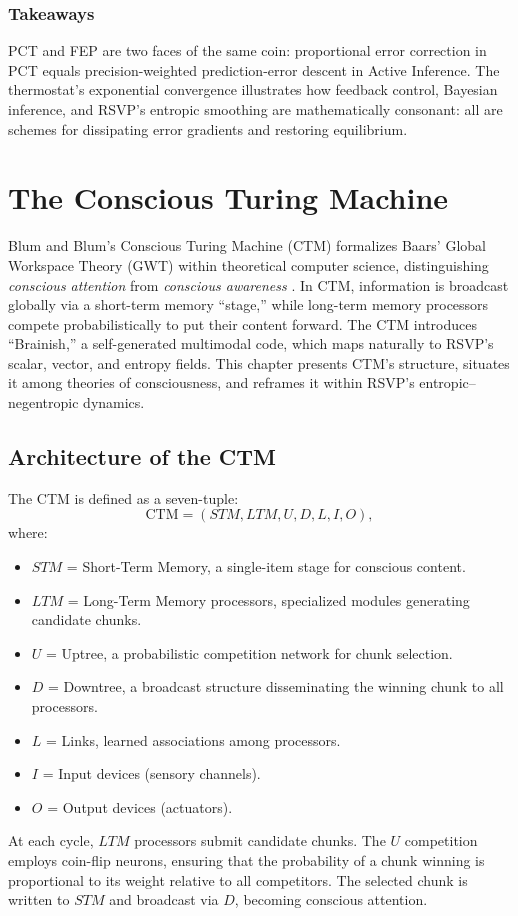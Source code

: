 \documentclass[a4paper,11pt,openany]{book}
\begin{document}
\subsection{Takeaways}

PCT and FEP are two faces of the same coin: proportional error correction in PCT equals precision-weighted prediction-error descent in Active Inference. The thermostat’s exponential convergence illustrates how feedback control, Bayesian inference, and RSVP’s entropic smoothing are mathematically consonant: all are schemes for dissipating error gradients and restoring equilibrium.

\chapter{The Conscious Turing Machine}

Blum and Blum’s Conscious Turing Machine (CTM) formalizes Baars’ Global Workspace Theory 
(GWT) within theoretical computer science, distinguishing \emph{conscious attention} from 
\emph{conscious awareness} \citep{blum2021ctm, baars1988cognitive}. In CTM, information is 
broadcast globally via a short-term memory “stage,” while long-term memory processors 
compete probabilistically to put their content forward. The CTM introduces “Brainish,” a 
self-generated multimodal code, which maps naturally to RSVP’s scalar, vector, and entropy 
fields. This chapter presents CTM’s structure, situates it among theories of consciousness, 
and reframes it within RSVP’s entropic–negentropic dynamics.

\section{Architecture of the CTM}
The CTM is defined as a seven-tuple:
\[
\text{CTM} = (STM, LTM, U, D, L, I, O),
\]
where:
\begin{itemize}
  \item $STM$ = Short-Term Memory, a single-item stage for conscious content.
  \item $LTM$ = Long-Term Memory processors, specialized modules generating candidate chunks.
  \item $U$ = Uptree, a probabilistic competition network for chunk selection.
  \item $D$ = Downtree, a broadcast structure disseminating the winning chunk to all processors.
  \item $L$ = Links, learned associations among processors.
  \item $I$ = Input devices (sensory channels).
  \item $O$ = Output devices (actuators).
\end{itemize}
At each cycle, $LTM$ processors submit candidate chunks. The $U$ competition employs 
coin-flip neurons, ensuring that the probability of a chunk winning is proportional to its 
weight relative to all competitors. The selected chunk is written to $STM$ and broadcast 
via $D$, becoming conscious attention.
\end{document}
